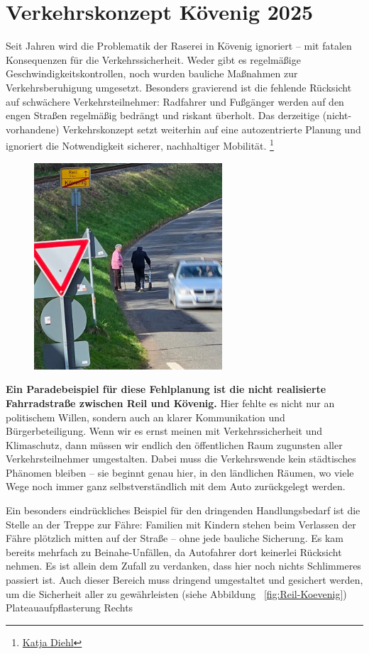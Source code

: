 \section{Verkehrskonzept Kövenig 2025}	

Seit Jahren wird die Problematik der Raserei in Kövenig ignoriert – mit fatalen Konsequenzen für die Verkehrssicherheit. Weder gibt es regelmäßige Geschwindigkeitskontrollen, noch wurden bauliche Maßnahmen zur Verkehrsberuhigung umgesetzt. Besonders gravierend ist die fehlende Rücksicht auf schwächere Verkehrsteilnehmer: Radfahrer und Fußgänger werden auf den engen Straßen regelmäßig bedrängt und riskant überholt. Das derzeitige (nicht-vorhandene) Verkehrskonzept setzt weiterhin auf eine autozentrierte Planung und ignoriert die Notwendigkeit sicherer, nachhaltiger Mobilität. \footnote{\href{https://katja-diehl.de/}{Katja Diehl}}
\begin{figure}
\includegraphics[width=7cm]{"bild7"}
\end{figure}
\textbf{Ein Paradebeispiel für diese Fehlplanung ist die nicht realisierte Fahrradstraße zwischen Reil und Kövenig.} Hier fehlte es nicht nur an politischem Willen, sondern auch an klarer Kommunikation und Bürgerbeteiligung. Wenn wir es ernst meinen mit Verkehrssicherheit und Klimaschutz, dann müssen wir endlich den öffentlichen Raum zugunsten aller Verkehrsteilnehmer umgestalten. Dabei muss die Verkehrswende kein städtisches Phänomen bleiben – sie beginnt genau hier, in den ländlichen Räumen, wo viele Wege noch immer ganz selbstverständlich mit dem Auto zurückgelegt werden.

Ein besonders eindrückliches Beispiel für den dringenden Handlungsbedarf ist die Stelle an der Treppe zur Fähre: Familien mit Kindern stehen beim Verlassen der Fähre plötzlich mitten auf der Straße – ohne jede bauliche Sicherung. Es kam bereits mehrfach zu Beinahe-Unfällen, da Autofahrer dort keinerlei Rücksicht nehmen. Es ist allein dem Zufall zu verdanken, dass hier noch nichts Schlimmeres passiert ist. Auch dieser Bereich muss dringend umgestaltet und gesichert werden, um die Sicherheit aller zu gewährleisten (siehe Abbildung ~\ref{fig:Reil-Koevenig}) Plateauaufpflasterung Rechts

